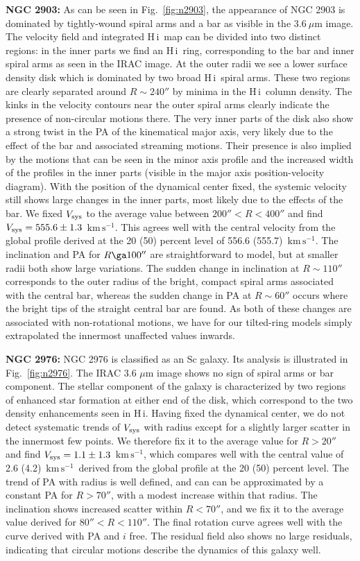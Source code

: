 \documentclass[usenatbib,usegraphicx,apjfonts,floatfix]{emulateapj}
\newcommand{\kms}{\ensuremath{\,\mbox{km}\,\mbox{s}^{-1}}}
\newcommand{\HI}{H\,{\sc i}}
\begin{document}
{\bf NGC 2903:} As can be seen in Fig.~\ref{fig:n2903}, the appearance
of NGC 2903 is dominated by tightly-wound spiral arms and a bar as
visible in the $3.6\ \mu$m image.  The velocity field and integrated
\HI\ map can be divided into two distinct regions: in the inner parts
we find an \HI\ ring, corresponding to the bar and inner spiral arms
as seen in the IRAC image. At the outer radii we see a lower surface
density disk which is dominated by two broad \HI\ spiral arms. These
two regions are clearly separated around $R\sim 240''$ by minima in
the \HI\ column density.  The kinks in the velocity contours near the
outer spiral arms clearly indicate the presence of non-circular
motions there. The very inner parts of the disk also show a strong
twist in the PA of the kinematical major axis, very likely due to the
effect of the bar and associated streaming motions. Their presence is
also implied by the motions that can be seen in the minor axis profile
and the increased width of the profiles in the inner parts (visible in
the major axis position-velocity diagram).  With the position of the
dynamical center fixed, the systemic velocity still shows large
changes in the inner parts, most likely due to the effects of the bar.
We fixed $V_{\rm sys}$ to the average value between $200'' < R <
400''$ and find $V_{\rm sys} = 555.6 \pm 1.3$ \kms.  This agrees well
with the central velocity from the global profile derived at the 20
(50) percent level of 556.6 (555.7) \kms.  The inclination and PA for
$R \ga 100''$ are straightforward to model, but at smaller radii both
show large variations. The sudden change in inclination at $R\sim
110''$ corresponds to the outer radius of the bright, compact spiral
arms associated with the central bar, whereas the sudden change in PA
at $R \sim 60''$ occurs where the bright tips of the straight central
bar are found.  As both of these changes are associated with
non-rotational motions, we have for our tilted-ring models simply
extrapolated the innermost unaffected values inwards.

{\bf NGC 2976:} NGC 2976 is classified as an Sc galaxy. Its analysis
is illustrated in Fig.~\ref{fig:n2976}.  The IRAC 3.6 $\mu$m image
shows no sign of spiral arms or bar component.  The stellar component
of the galaxy is characterized by two regions of enhanced star
formation at either end of the disk, which correspond to the two
density enhancements seen in \HI.
Having fixed the dynamical center, we do not detect systematic
trends of $V_{\rm sys}$ with radius except for a slightly larger
scatter in the innermost few points. We therefore fix it to the
average value for $R>20''$ and find $V_{\rm sys} = 1.1 \pm 1.3$ \kms,
which compares well with the central value of 2.6 (4.2) \kms\ derived
from the global profile at the 20 (50) percent level.
The trend of PA with radius is well defined, and can can be
approximated by a constant PA for $R>70''$, with a modest increase
within that radius.  The inclination shows increased scatter within
$R<70''$, and we fix it to the average value derived for
$80''<R<110''$.  The final rotation curve agrees well with the curve
derived with PA and $i$ free.  The residual field also shows no large
residuals, indicating that circular motions describe the dynamics of
this galaxy well.
\end{document}
